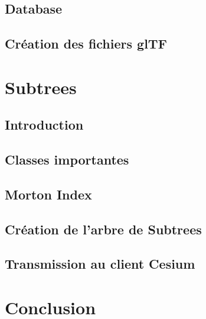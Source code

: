 \documentclass[
    TIC, %
    il, %
]{heig-tb}
\begin{document}
\newpage
\section{Database}
\label{sec:database}


\newpage
\section{Création des fichiers glTF}
\label{sec:gltf}


\newpage
\chapter{Subtrees}
\label{chap:subtrees}

\section{Introduction}
\label{sec:subtrees-intro}


\newpage
\section{Classes importantes}
\label{sec:classes}


\newpage
\section{Morton Index}
\label{sec:morton}


\newpage
\section{Création de l'arbre de Subtrees}
\label{sec:subtree-creation}


\newpage
\section{Transmission au client Cesium}
\label{sec:transmission}


\chapter{Conclusion}
\label{sec:conclusion}


\clearpage
\printbibliography
\end{document}
